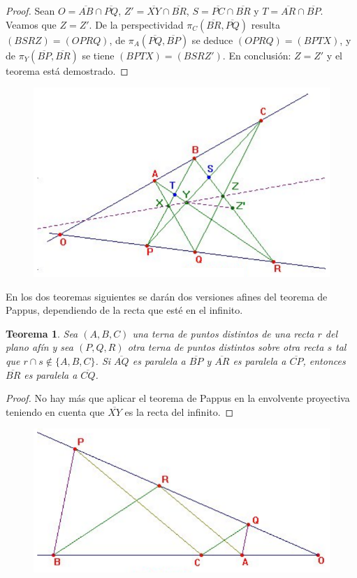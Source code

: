\documentclass[12pt]{report}
\newtheorem{theorem}{Teorema}[chapter]
\theoremstyle{definition}
\theoremstyle{definition}
\theoremstyle{remark}
\begin{document}
\begin{proof}
Sean $O = \overline{AB} \cap \overline{PQ}$, $Z' = \overline{XY} \cap \overline{BR}$, $S = \overline{PC} \cap \overline{BR}$ y $T = \overline{AR} \cap \overline{BP}$. Veamos que $Z = Z'$. De la perspectividad $\pi_C(\overline{BR},\overline{PQ})$ resulta $(BSRZ) = (OPRQ)$, de $\pi_A(\overline{PQ}, \overline{BP})$ se deduce $(OPRQ) = (BPTX)$, y de $\pi_Y(\overline{BP}, \overline{BR})$ se tiene $(BPTX) = (BSRZ')$. En conclusión: $Z = Z'$ y el teorema está demostrado.
\end{proof}

\begin{figure}[h]
\includegraphics[scale = 0.30]{3.2_1}
\centering
\end{figure}

En los dos teoremas siguientes se darán dos versiones afines del teorema de Pappus, dependiendo de la recta que esté en el infinito.

\begin{theorem}
Sea $(A,B,C)$ una terna de puntos distintos de una recta $r$ del plano afín y sea $(P,Q,R)$ otra terna de puntos distintos sobre otra recta $s$ tal que $r \cap s \notin \{A,B,C\}$. Si $\overline{AQ}$ es paralela a $\overline{BP}$ y $\overline{AR}$ es paralela a $\overline{CP}$, entonces $\overline{BR}$ es paralela a $\overline{CQ}$.
\end{theorem}

\begin{proof}
No hay más que aplicar el teorema de Pappus en la envolvente proyectiva teniendo en cuenta que $\overline{XY}$ es la recta del infinito.
\end{proof}

\begin{figure}[h]
\includegraphics[scale = 0.30]{3.2_2}
\centering
\end{figure}
\end{document}
